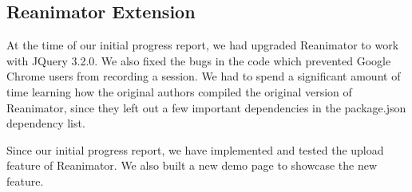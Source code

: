 \documentclass[12pt,journal]{IEEEtran}
\begin{document}
\subsection{Reanimator Extension}
At the time of our initial progress report, we had upgraded Reanimator to work with JQuery 3.2.0. We also fixed the bugs in the code which prevented Google Chrome users from recording a session. We had to spend a significant amount of time learning how the original authors compiled the original version of Reanimator, since they left out a few important dependencies in the package.json dependency list.
\par
Since our initial progress report, we have implemented and tested the upload feature of Reanimator. We also built a new demo page to showcase the new feature.





\printbibliography
\end{document}
